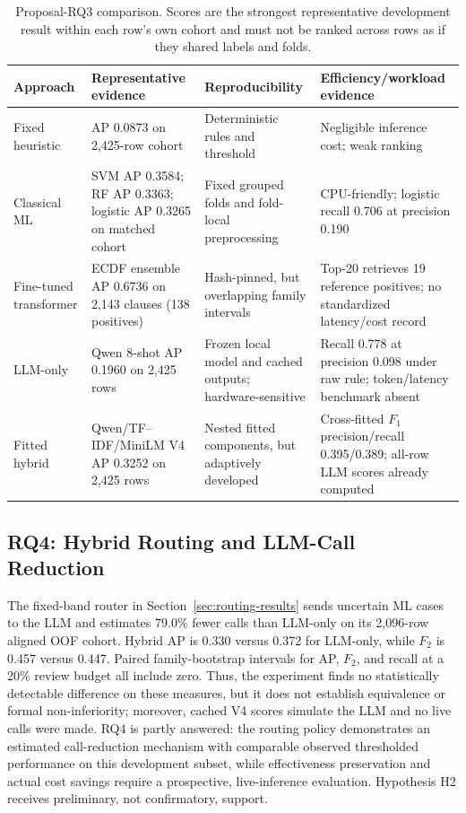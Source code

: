 \documentclass[12pt,a4paper,oneside]{report}
\begin{document}
\begin{table}[!tbp]
\caption{Proposal-RQ3 comparison. Scores are the strongest representative development result within each row's own cohort and must not be ranked across rows as if they shared labels and folds.}
\label{tab:rq3-comparison}
\centering
\small
\setlength{\tabcolsep}{4pt}
\begin{tabularx}{\textwidth}{>{\raggedright\arraybackslash}p{}>{\raggedright\arraybackslash}p{}YY}
\toprule
Approach & Representative evidence & Reproducibility & Efficiency/workload evidence \tabularnewline
\midrule
Fixed heuristic & AP 0.0873 on 2,425-row cohort & Deterministic rules and threshold & Negligible inference cost; weak ranking \tabularnewline
Classical ML & SVM AP 0.3584; RF AP 0.3363; logistic AP 0.3265 on matched cohort & Fixed grouped folds and fold-local preprocessing & CPU-friendly; logistic recall 0.706 at precision 0.190 \tabularnewline
Fine-tuned transformer & ECDF ensemble AP 0.6736 on 2,143 clauses (138 positives) & Hash-pinned, but overlapping family intervals & Top-20 retrieves 19 reference positives; no standardized latency/cost record \tabularnewline
LLM-only & Qwen 8-shot AP 0.1960 on 2,425 rows & Frozen local model and cached outputs; hardware-sensitive & Recall 0.778 at precision 0.098 under raw rule; token/latency benchmark absent \tabularnewline
Fitted hybrid & Qwen/TF--IDF/MiniLM V4 AP 0.3252 on 2,425 rows & Nested fitted components, but adaptively developed & Cross-fitted $F_1$ precision/recall 0.395/0.389; all-row LLM scores already computed \tabularnewline
\bottomrule
\end{tabularx}
\end{table}

\subsection{RQ4: Hybrid Routing and LLM-Call Reduction}

The fixed-band router in Section~\ref{sec:routing-results} sends uncertain ML cases to the LLM and estimates 79.0\% fewer calls than LLM-only on its 2,096-row aligned OOF cohort. Hybrid AP is 0.330 versus 0.372 for LLM-only, while $F_2$ is 0.457 versus 0.447. Paired family-bootstrap intervals for AP, $F_2$, and recall at a 20\% review budget all include zero. Thus, the experiment finds no statistically detectable difference on these measures, but it does not establish equivalence or formal non-inferiority; moreover, cached V4 scores simulate the LLM and no live calls were made. RQ4 is partly answered: the routing policy demonstrates an estimated call-reduction mechanism with comparable observed thresholded performance on this development subset, while effectiveness preservation and actual cost savings require a prospective, live-inference evaluation. Hypothesis H2 receives preliminary, not confirmatory, support.
\end{document}
